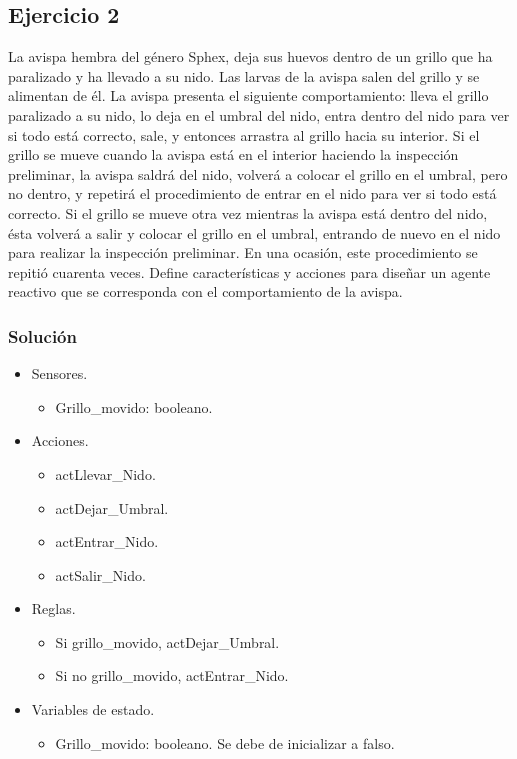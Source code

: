 \subsection*{Ejercicio 2}

La avispa hembra del género Sphex, deja sus huevos dentro de un grillo que ha paralizado y ha 
llevado  a  su  nido.  Las  larvas  de  la  avispa  salen  del  grillo  y  se  alimentan  de  él.  La  avispa 
presenta el siguiente comportamiento: lleva el grillo paralizado a su nido, lo deja en el umbral 
del nido, entra dentro del nido para ver si todo está correcto, sale, y entonces arrastra al grillo 
hacia  su  interior.  Si  el  grillo  se  mueve  cuando  la  avispa  está  en  el  interior  haciendo  la 
inspección preliminar, la avispa saldrá del nido, volverá a colocar el grillo en el umbral, pero no 
dentro, y repetirá el procedimiento de entrar en el nido para ver si todo está correcto. Si el grillo 
se mueve otra vez mientras la avispa está dentro del nido, ésta volverá a salir y colocar el grillo 
en  el  umbral,  entrando  de  nuevo  en  el  nido  para  realizar  la  inspección  preliminar.  En  una 
ocasión,  este  procedimiento  se  repitió  cuarenta  veces.  Define  características  y  acciones  para 
diseñar un agente reactivo que se corresponda con el comportamiento de la avispa.

\subsubsection*{Solución}

\begin{itemize}
    \item Sensores.
    \begin{itemize}
        \item Grillo\_movido: booleano.
    \end{itemize}
    \item Acciones.
    \begin{itemize}
        \item actLlevar\_Nido.
        \item actDejar\_Umbral.
        \item actEntrar\_Nido.
        \item actSalir\_Nido.
    \end{itemize}
    \item Reglas.
    \begin{itemize}
        \item Si grillo\_movido, actDejar\_Umbral.
        \item Si no grillo\_movido, actEntrar\_Nido.
    \end{itemize}
    \item Variables de estado.
    \begin{itemize}
        \item Grillo\_movido: booleano. Se debe de inicializar a falso.
    \end{itemize}
\end{itemize}   

